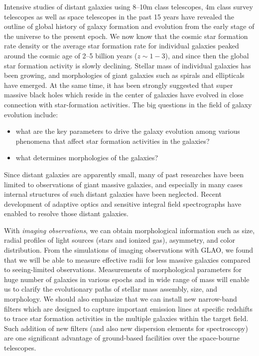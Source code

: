 Intensive studies of distant galaxies using 8--10m class telescopes, 
4m class survey telescopes as well as space telescopes in the past 15
years have revealed the outline of global history of galaxy formation
and evolution from the early stage of the universe to the present
epoch. We now know that the cosmic star formation rate density or the
average star formation rate for individual galaxies peaked around the
cosmic age of 2--5 billion years ($z\sim1-3$), and since then the global
star formation activity is slowly declining. Stellar mass of
individual galaxies has been growing, and morphologies of giant
galaxies such as spirals and ellipticals have emerged. At the same time,
it has been strongly suggested that super massive black holes which
reside in the center of galaxies have evolved in close connection with
star-formation activities. 
The big questions in the field of galaxy evolution include:
\begin{itemize}
 \setlength{\itemsep}{-3pt}
 \item what are the key parameters to drive the galaxy evolution among
       various phenomena that affect star formation activities in the
       galaxies?
 \item what determines morphologies of the galaxies?
\end{itemize}
Since distant galaxies are apparently small, many of past researches
have been limited to observations of giant massive galaxies, and
especially in many cases internal structures of such distant galaxies
have been neglected. 
Recent development of adaptive optics and sensitive integral field
spectrographs have enabled to resolve those distant galaxies. 

With {\it imaging observations}, we can obtain morphological information
such as size, radial profiles of light sources (stars and ionized gas),
asymmetry, and color distribution. From the simulations of imaging
observations with GLAO, 
we found that we will be able to measure effective radii for less
massive galaxies compared to seeing-limited observations. Measurements
of morphological parameters for huge number of galaxies in various
epochs and in wide  range of mass will enable us to clarify the
evolutionary paths of stellar mass assembly, size, and morphology. We
should also emphasize that we can install new narrow-band filters which
are designed to capture important emission lines at specific redshifts
to trace star formation activities in the multiple galaxies within the
target field. Such addition of new filters (and also new dispersion 
elements for spectroscopy) are one significant advantage of ground-based
facilities over the space-bourne telescopes. 

